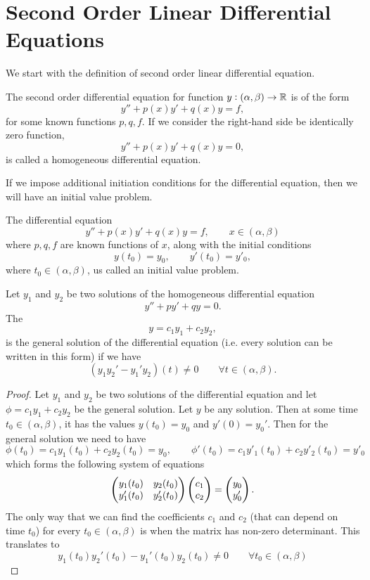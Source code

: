 \chapter{Second Order Linear Differential Equations}


We start with the definition of second order linear differential equation.

\begin{definition}
	The second order differential equation for function $ y:(\alpha,\beta)\to\mathbb{R} $ is of the form
	 \[y'' + p(x)y' + q(x)y = f,\] 
	for some known functions $ p, q, f $. If we consider the right-hand side be identically zero function, 
	\[ y'' + p(x)y' + q(x)y = 0, \]
	is called a homogeneous differential equation.
\end{definition}

If we impose additional initiation conditions for the differential equation, then we will have an initial value problem.

\begin{definition}
	The differential equation
	\[y'' + p(x)y' + q(x)y = f, \qquad x \in (\alpha, \beta)\] 
	where $ p,q,f $ are known functions of $ x $, along with the initial conditions
	\[ y(t_0) = y_0, \qquad y'(t_0) = y'_0, \]
	where $ t_0 \in (\alpha,\beta) $, us called an initial value problem.
\end{definition}
\newpage

\begin{theorem}
	Let $ y_1 $ and $ y_2 $ be two solutions of the homogeneous differential equation 
	\[ y'' + py' + qy = 0. \]
	The 
	\[ y = c_1 y_1 + c_2 y_2, \]
	is the general solution of the differential equation (i.e. every solution can be written in this form) if we have
	\[ (y_1 y_2' - y_1'y_2)(t) \neq 0 \qquad  \forall t\in (\alpha, \beta).  \]
\end{theorem}

\begin{proof}
	Let $ y_1 $ and $ y_2 $ be two solutions of the differential equation and let $ \phi = c_1y_1 + c_2y_2 $ be the general solution. Let $ y $ be any solution. Then at some time $ t_0 \in (\alpha, \beta) $, it has the values $ y(t_0) = y_0 $ and $ y'(0) = y_0' $. Then for the general solution we need to have
	\[ \phi(t_0) = c_1y_1(t_0) + c_2y_2(t_0) = y_0, \qquad \phi'(t_0) = c_1y'_1(t_0)+ c_2y'_2(t_0) = y'_0  \]
	which forms the following system of equations
	\[ \begin{pmatrix} y_1(t_0) & y_2(t_0) \\ y_1'(t_0) & y_2'(t_0) \end{pmatrix}\begin{pmatrix} c_1 \\ c_2 \end{pmatrix} = \begin{pmatrix} y_0 \\ y'_0 \end{pmatrix}. \]
	The only way that we can find the coefficients $ c_1 $ and $ c_2 $ (that can depend on time $ t_0 $) for every $ t_0 \in (\alpha, \beta) $ is when the matrix has non-zero determinant. This translates to
	\[ y_1(t_0)y_2'(t_0) - y_1'(t_0)y_2(t_0) \neq 0 \qquad \forall t_0 \in (\alpha,\beta) \]
\end{proof}

